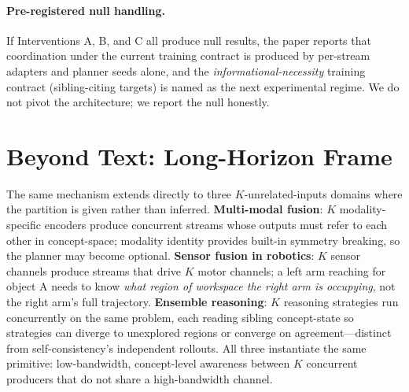 \paragraph{Pre-registered null handling.} If Interventions A, B, and C all produce null results, the paper reports that coordination under the current training contract is produced by per-stream adapters and planner seeds alone, and the \emph{informational-necessity} training contract (sibling-citing targets) is named as the next experimental regime. We do not pivot the architecture; we report the null honestly.

\section{Beyond Text: Long-Horizon Frame}

The same mechanism extends directly to three $K$-unrelated-inputs domains where the partition is given rather than inferred. \textbf{Multi-modal fusion}: $K$ modality-specific encoders produce concurrent streams whose outputs must refer to each other in concept-space; modality identity provides built-in symmetry breaking, so the planner may become optional. \textbf{Sensor fusion in robotics}: $K$ sensor channels produce streams that drive $K$ motor channels; a left arm reaching for object A needs to know \emph{what region of workspace the right arm is occupying}, not the right arm's full trajectory. \textbf{Ensemble reasoning}: $K$ reasoning strategies run concurrently on the same problem, each reading sibling concept-state so strategies can diverge to unexplored regions or converge on agreement---distinct from self-consistency's independent rollouts. All three instantiate the same primitive: low-bandwidth, concept-level awareness between $K$ concurrent producers that do not share a high-bandwidth channel.
